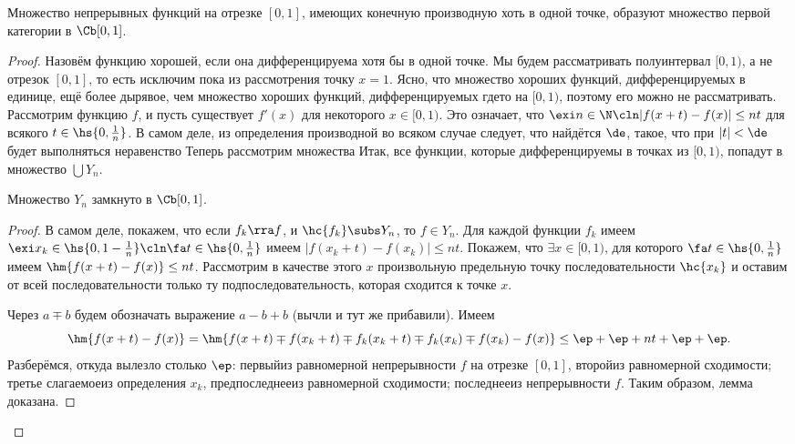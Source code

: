 \documentclass[a4paper]{article}
\begin{document}
\begin{theorem}
Множество непрерывных функций на отрезке $[0,1]$, имеющих конечную производную хоть в одной точке,
образуют множество первой категории в $\Cb[0,1]$.
\end{theorem}
\begin{proof}
Назовём функцию хорошей, если она дифференцируема хотя бы в одной точке.
Мы будем рассматривать полуинтервал $[0,1)$, а не отрезок $[0,1]$, то есть исключим
пока из рассмотрения точку $x=1$. Ясно, что множество хороших функций, дифференцируемых в
единице, ещё более дырявое, чем множество хороших функций,
дифференцируемых где\д то на $[0,1)$, поэтому его можно не рассматривать.
Рассмотрим функцию $f$, и пусть существует $f'(x)$ для некоторого $x \in [0,1)$. Это означает, что
$\exi n \in \N\cln |f(x+t)-f(x)| \le nt$ для всякого $t \in \hs{0,\frac1n}$.
В самом деле, из определения производной во всяком случае следует, что найдётся $\de$, такое, что при $|t|<\de$
будет выполняться неравенство
Теперь рассмотрим множества
Итак, все функции, которые дифференцируемы в точках из $[0,1)$, попадут в множество $\bigcup Y_n$.

\begin{lemma}
Множество $Y_n$ замкнуто в $\Cb[0,1]$.
\end{lemma}
\begin{proof}
В самом деле, покажем, что если $f_k \rra f$, и $\hc{f_k} \subs Y_n$, то $f \in Y_n$.
Для каждой функции $f_k$ имеем $\exi x_k \in \hs{0,1-\frac1n} \cln \fa t \in \hs{0,\frac1n}$
имеем $|f(x_k +t) -f(x_k)| \le nt$. Покажем, что $\exi x \in [0,1)$, для которого
$\fa t \in \hs{0,\frac1n}$ имеем $\hm{f(x+t)-f(x)} \le nt$.
Рассмотрим в качестве этого $x$ произвольную предельную точку последовательности $\hc{x_k}$
и оставим от всей последовательности только ту подпоследовательность, которая сходится
к точке $x$.

Через $a \mp b$ будем обозначать выражение $a - b + b$ (вычли и тут же прибавили). Имеем
$$\hm{f(x+t)-f(x)} = \hm{f(x+t) \mp f(x_k+t) \mp f_k(x_k+t) \mp f_k(x_k) \mp f(x_k) -f(x)} \le \ep + \ep + nt + \ep + \ep.$$
Разберёмся, откуда вылезло столько $\ep$: первый\т из равномерной непрерывности $f$ на отрезке $[0,1]$,
второй\т из равномерной сходимости; третье слагаемое\т из определения $x_k$, предпоследнее\т из равномерной сходимости;
последнее\т из непрерывности $f$. Таким образом, лемма доказана.
\end{proof}


\end{proof}
\end{document}
